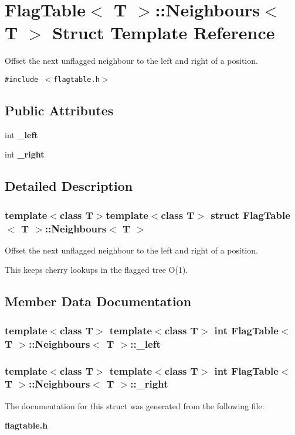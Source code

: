\section{Flag\-Table$<$ T $>$::Neighbours$<$ T $>$ Struct Template Reference}
\label{structFlagTable_1_1Neighbours}
Offset the next unflagged neighbour to the left and right of a position.  


{\tt \#include $<$flagtable.h$>$}

\subsection*{Public Attributes}
\begin{CompactItemize}
\item 
int {\bf \_\-left}
\item 
int {\bf \_\-right}
\end{CompactItemize}


\subsection{Detailed Description}
\subsubsection*{template$<$class T$>$template$<$class T$>$ struct Flag\-Table$<$ T $>$::Neighbours$<$ T $>$}

Offset the next unflagged neighbour to the left and right of a position. 

This keeps cherry lookups in the flagged tree O(1). 



\subsection{Member Data Documentation}
\subsubsection{\setlength{\rightskip}{0pt plus 5cm}template$<$class T$>$ template$<$class T$>$ int {\bf Flag\-Table}$<$ T $>$::{\bf Neighbours}$<$ T $>$::{\bf \_\-left}}\label{structFlagTable_1_1Neighbours_o0}


\subsubsection{\setlength{\rightskip}{0pt plus 5cm}template$<$class T$>$ template$<$class T$>$ int {\bf Flag\-Table}$<$ T $>$::{\bf Neighbours}$<$ T $>$::{\bf \_\-right}}\label{structFlagTable_1_1Neighbours_o1}




The documentation for this struct was generated from the following file:\begin{CompactItemize}
\item 
{\bf flagtable.h}\end{CompactItemize}
